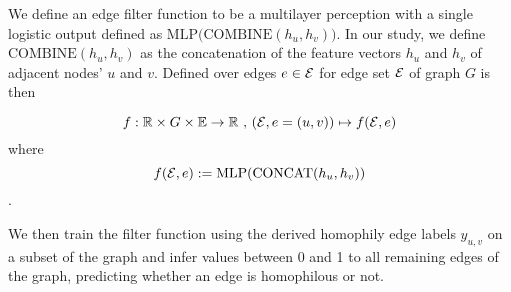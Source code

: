 We define an edge filter function to be a multilayer perception with a single logistic output defined as $\text{MLP}\big(\text{COMBINE}(h_u,h_v)\big)$. In our study, we define $\text{COMBINE}(h_u,h_v)$ as the concatenation of the feature vectors $h_u$ and $h_v$ of adjacent nodes' $u$ and $v$. Defined over edges $e\in\mathcal{E}$ for edge set $\mathcal{E}$ of graph $G$ is then 

\[ f : \mathbb{R} \times G \times \mathbb{E} \to \mathbb{R}\text{ , }( \mathcal{E}, e=(u,v)) \mapsto f( \mathcal{E}, e)\]
where
\[f( \mathcal{E}, e):= \text{MLP}(\text{CONCAT}(h_u,h_v))\]. 

We then train the filter function using the derived homophily edge labels $y_{u,v}$ on a subset of the graph and infer values between 0 and 1 to all remaining edges of the graph, predicting whether an edge is homophilous or not.